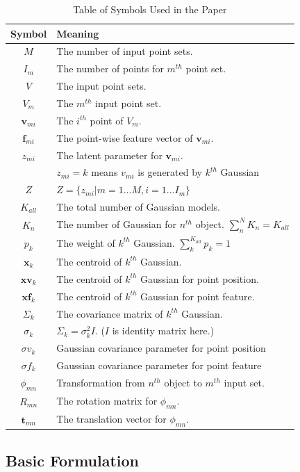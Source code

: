 \begin{table}[!hbp]
\centering
\begin{tabular}{c l}
\hline
Symbol & Meaning\\
\hline
$M$ & The number of input point sets.\\
$I_m$ & The number of points for $m^{th}$ point set.\\
$V$ & The input point sets.\\
$V_m$ & The $m^{th}$ input point set.\\
$\pmb v_{mi}$ & The $i^{th}$ point of $V_m$.\\
$\pmb f_{mi}$ & The point-wise feature vector of $\pmb v_{mi}$.\\
$z_{mi}$ & The latent parameter for $\pmb v_{mi}$.\\
& $z_{mi}=k$ means $v_{mi}$ is generated by $k^{th}$ Gaussian\\
$Z$ & $Z=\{z_{mi}|m=1...M,i=1...I_m\}$\\
$K_{all}$ & The total number of Gaussian models.\\
$K_n$   & The number of Gaussian for $n^{th}$ object. $\sum_n^N K_n = K_{all}$\\
$p_k$  & The weight of $k^{th}$ Gaussian. $\sum_k^{K_{all}}p_k=1$\\
$\pmb x_k$ & The centroid of $k^{th}$ Gaussian.\\
$\pmb {xv}_k$ & The centroid of $k^{th}$ Gaussian for point position.\\
$\pmb {xf}_k$ & The centroid of $k^{th}$ Gaussian for point feature.\\
$\Sigma_k$ & The covariance matrix of $k^{th}$ Gaussian.\\
$\sigma_k$ & $\Sigma_k=\sigma_k^2I$. ($I$ is identity matrix here.)\\
$\sigma v_k$ & Gaussian covariance parameter for point position\\
$\sigma f_k$ & Gaussian covariance parameter for point feature\\
$\phi_{mn}$ & Transformation from $n^{th}$ object to $m^{th}$ input set.\\
$R_{mn}$ & The rotation matrix for $\phi_{mn}$.\\
$\pmb t_{mn}$ & The translation vector for $\phi_{mn}$.
\end{tabular}
\caption{Table of Symbols Used in the Paper}
\label{tab:symbol}
\end{table}
\subsection{Basic Formulation}

